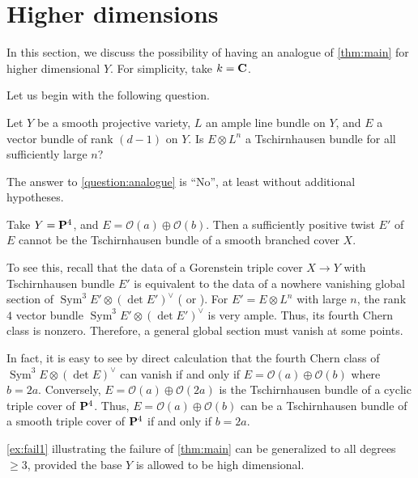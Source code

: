 \documentclass[11 pt]{amsart}
\renewcommand{\k}{k}
\renewcommand{\O}{{\mathcal O}}
\providecommand {\C}{{\bf C}}
\renewcommand {\P}{{\bf P}}
\providecommand{\Sym}{\operatorname{Sym}}
\numberwithin{equation}{section}
\begin{document}
\section{Higher dimensions} 
\label{sec:higher_dimensional_}

In this section, we discuss the possibility of having an analogue of \autoref{thm:main} for higher dimensional $Y$.
For simplicity, take $\k = \C$.

Let us begin with the following question.
\begin{question}\label{question:analogue}
  Let $Y$ be a smooth projective variety, $L$ an ample line bundle on $Y$, and $E$ a vector bundle of rank $(d-1)$ on $Y$.
  Is $E \otimes L^{n}$ a Tschirnhausen bundle for all sufficiently large $n$?
\end{question}

The answer to \autoref{question:analogue} is ``No'', at least without additional hypotheses. 
\begin{example}\label{ex:fail1}
  Take $Y = \P^{4}$, and $E = \O(a) \oplus \O(b)$.
  Then a sufficiently positive twist $E'$ of $E$ cannot be the Tschirnhausen bundle of a smooth branched cover $X$.

  To see this, recall that the data of a Gorenstein triple cover $X \to Y$ with Tschirnhausen bundle $E'$ is equivalent to the data of a nowhere vanishing global section of $\Sym^{3}E' \otimes (\det E')^{\vee}$ (\cite{mir:85} or \cite{cas.eke:96}).
  For $E' = E \otimes L^n$ with large $n$, the rank $4$ vector bundle $\Sym^{3}E' \otimes (\det E')^{\vee}$ is very ample.
  Thus, its fourth Chern class is nonzero.
  Therefore, a general global section must vanish at some points.

  In fact, it is easy to see by direct calculation that the fourth Chern class of $\Sym^{3}E \otimes (\det E)^{\vee}$ can vanish if and only if $E = \O(a) \oplus \O(b)$ where $b = 2a$.
  Conversely, $E = \O(a) \oplus \O(2a)$ is the Tschirnhausen bundle of a cyclic triple cover of $\P^4$.
  Thus, $E = \O(a) \oplus \O(b)$ can be a Tschirnhausen bundle of a smooth triple cover of $\P^4$ if and only if $b=2a$.  
\end{example}     
\autoref{ex:fail1} illustrating the failure of \autoref{thm:main} can be generalized to all degrees $\geq 3$, provided the base $Y$ is allowed to be high dimensional.
\end{document}

